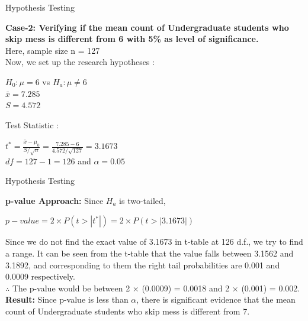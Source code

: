 \documentclass{beamer}
\begin{document}
\begin{frame}{Hypothesis Testing}
\begin{block}{}
\textbf{Case-2: Verifying if the mean count of Undergraduate students who skip mess is different from 6 with 5\% as level of significance.}\\
Here, sample size n = 127\\
Now, we set up the research hypotheses :
\begin{center}
$H_0 : \mu = 6$ \quad vs \quad $H_a : \mu \neq 6$\\
$\bar{x} = 7.285$\\
$S = 4.572$
\end{center}
Test Statistic :
\begin{center}
$t^* = \frac{\bar{x}-\mu_0}{S/\sqrt{n}} = \frac{7.285-6}{4.572/\sqrt{127}} = 3.1673$\\
$df = 127 - 1 = 126$ and $\alpha = 0.05$
\end{center}
\end{block}
\end{frame}

\begin{frame}{Hypothesis Testing}
\begin{block}{}
\textbf{p-value Approach:}
Since $H_a$ is two-tailed,
\begin{center}
$p-value = 2\times P(t>|t^*|) = 2\times P(t>|3.1673|)$ 
\end{center}
Since we do not find the exact value of 3.1673 in t-table at 126 d.f., we try to find a range. It can be seen from the t-table that the value falls between 3.1562 and 3.1892, and corresponding to them the right tail probabilities are 0.001 and 0.0009 respectively.\\
$\therefore$ The p-value would be between 2 × (0.0009) = 0.0018 and 2 × (0.001) = 0.002.\\
\textbf{Result:}
Since p-value is less than $\alpha$, there is significant evidence that the mean count of Undergraduate students who skip mess is different from 7.
\end{block}
\end{frame}
\end{document}
